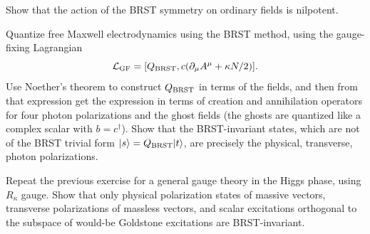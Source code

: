 \begin{banksproblems}

Show that the action of the BRST symmetry on ordinary fields is nilpotent.

Quantize free Maxwell electrodynamics using the BRST method, using the
gauge-fixing Lagrangian
\[
  \mathcal L_{\rm GF}=[Q_{\rm BRST},c(\partial_\mu A^\mu+\kappa N/2)].
\]
Use Noether's theorem to construct $Q_{\rm BRST}$ in terms of the fields, and
then from that expression get the expression in terms of creation and
annihilation operators for four photon polarizations and the ghost fields (the
ghosts are quantized like a complex scalar with $b=c^\dagger$). Show that the
BRST-invariant states, which are not of the BRST trivial form
$|s\rangle=Q_{\rm BRST}|t\rangle$, are precisely the physical, transverse,
photon polarizations.

Repeat the previous exercise for a general gauge theory in the Higgs phase,
using $R_\kappa$ gauge. Show that only physical polarization states of massive
vectors, transverse polarizations of massless vectors, and scalar excitations
orthogonal to the subspace of would-be Goldstone excitations are
BRST-invariant.


\end{banksproblems}
